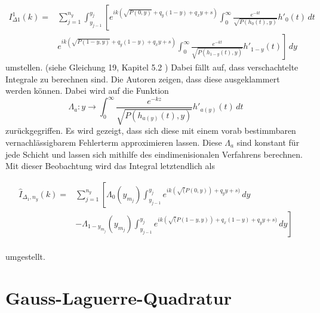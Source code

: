 \begin{equation}
    \begin{aligned}
    I_{\Delta1}^1(k) =&  \sum_{j = 1}^{n_y}  \int_{y_{j-1}}^{y_j} \left[ e^{ik(\sqrt{P(0,y)}+q_y(1-y)+q_xy+s)} \int_{0}^{\infty} \frac{e^{-kt}}{\sqrt{P(h_0(t),y)}}h'_0(t) \,dt  \right. \\
    & \left. e^{ik(\sqrt{P(1-y,y)}+q_y(1-y)+q_xy+s)} \int_{0}^{\infty} \frac{e^{-kt}}{\sqrt{P(h_{1-y}(t),y)}}h'_{1-y}(t) \right] \,dy  
    \end{aligned}
\end{equation}
umstellen. (siehe Gleichung 19, Kapitel 5.2 \cite{gasperini:hal-03209144}) Dabei fällt auf, dass verschachtelte Integrale zu berechnen sind. Die Autoren zeigen, dass diese ausgeklammert werden können.
Dabei wird auf die Funktion 
\begin{equation}
  \Lambda_a : y \rightarrow \int_{0}^{\infty} \frac{e^{-kz}}{\sqrt{P(h_{a(y)}(t),y)}} h'_{a(y)}(t) \,dt 
\end{equation}
zurückgegriffen. Es wird gezeigt, dass sich diese mit einem vorab bestimmbaren vernachlässigbarem Fehlerterm approximieren lassen. Diese $\Lambda_a$ sind konstant für jede Schicht und lassen sich mithilfe des eindimenisionalen Verfahrens berechnen.
Mit dieser Beobachtung wird das Integral letztendlich als

\begin{equation}
    \begin{aligned}
        \hat{I}_{\Delta_1,n_y}(k) = & \sum_{j = 1}^{n_y} \left[ \Lambda_0(y_{m_j}) \int_{y_{j-1}}^{y_j}  e^{ik(\sqrt(P(0,y))+q_yy+s)}\,dy \right.\\
        & \left.  - \Lambda_{1-y_{m_j}}(y_{m_j}) \int_{y_{j-1}}^{y_j}  e^{ik(\sqrt(P(1-y,y))+q_x(1-y)+q_yy+s)}\,dy  \right] \\
    \end{aligned}
\end{equation}

umgestellt.


\section{Gauss-Laguerre-Quadratur}

